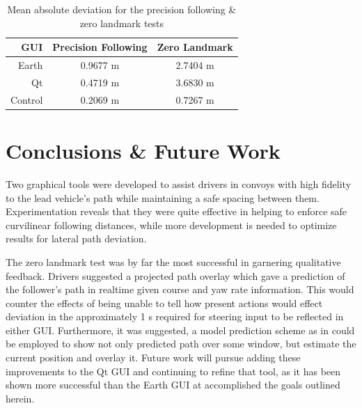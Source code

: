 \documentclass[twocolumn,10pt]{article}
\begin{document}

  \begin{table}[htbp] \centering
    \caption{Mean absolute deviation for the precision following \& zero landmark tests}
    \begin{tabular}{r|c|c|} 
      GUI&         Precision Following & Zero Landmark \\
      \hline
      Earth&      0.9677 m & 2.7404 m \\
      Qt&         0.4719 m & 3.6830 m \\
      Control&    0.2069 m & 0.7267 m \\ \hline 
    \end{tabular}
    \label{tab:zero_dev_mean}
  \end{table}



\section*{Conclusions \& Future Work}

  Two graphical tools were developed to assist drivers in convoys with high fidelity to the lead vehicle’s path while maintaining a safe spacing between them.  Experimentation reveals that they were quite effective in helping to enforce safe curvilinear following distances, while more development is needed to optimize results for lateral path deviation.  

  The zero landmark test was by far the most successful in garnering qualitative feedback.  Drivers suggested a projected path overlay which gave a prediction of the follower’s path in realtime given course and yaw rate information.  This would counter the effects of being unable to tell how present actions would effect deviation in the approximately 1 s required for steering input to be reflected in either GUI.  Furthermore, it was suggested, a model prediction scheme as in \cite{williamthesis} could be employed to show not only predicted path over some window, but estimate the current position and overlay it.  Future work will pursue adding these improvements to the Qt GUI and continuing to refine that tool, as it has been shown more successful than the Earth GUI at accomplished the goals outlined herein.




\nocite{CofieldUGThesis}

\end{document}
